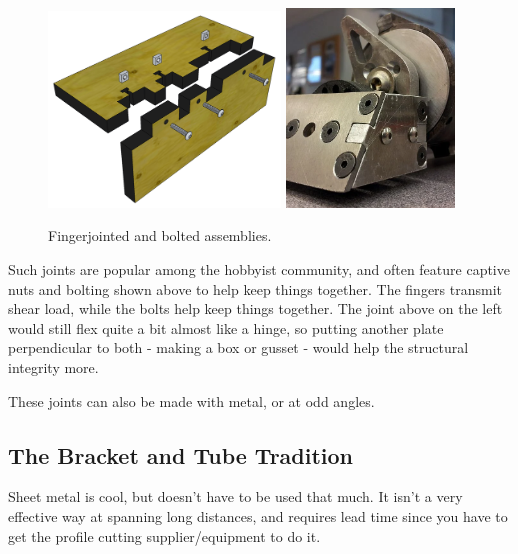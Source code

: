 \documentclass[10pt,letterpaper]{book}
\begin{document}
	\begin{figure}[H]
		\includegraphics[width=0.55\textwidth]{imgs/tradition_fingerjoint.png}
		\includegraphics[width=0.4\textwidth]{imgs/fingerjoint_battlebot.png}
		\caption{Fingerjointed and bolted assemblies.}
	\end{figure}
	
	Such joints are popular among the hobbyist community, and often feature captive nuts and bolting shown above to help keep things together. The fingers transmit shear load, while the bolts help keep things together. The joint above on the left would still flex quite a bit almost like a hinge, so putting another plate perpendicular to both - making a box or gusset - would help the structural integrity more.
	
	These joints can also be made with metal, or at odd angles.
	
	\subsection{The Bracket and Tube Tradition}
	Sheet metal is cool, but doesn't have to be used that much. It isn't a very effective way at spanning long distances, and requires lead time since you have to get the profile cutting supplier/equipment to do it.
	
\end{document}
